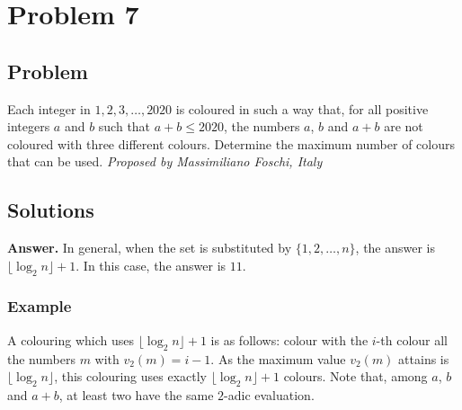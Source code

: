 \section{Problem 7}

\subsection{Problem}
Each integer in ${1, 2, 3, \ldots, 2020}$ is coloured in such a way that, for all positive integers $a$ and $b$ such that $a+b \leq 2020$, the numbers $a$, $b$ and $a+b$ are not coloured with three different colours. Determine the maximum number of colours that can be used. \nl
\textit{Proposed by Massimiliano Foschi, Italy}

\subsection{Solutions}
\textbf{Answer.} In general, when the set is substituted by $\{1, 2, \ldots, n\}$, the answer is $\lfloor \log_2 n \rfloor +1$. In this case, the answer is $11$.
\subsubsection{Example}
A colouring which uses $\lfloor \log_2 n \rfloor+1$ is as follows: colour with the $i$-th colour all the numbers $m$ with $v_2(m)=i-1$. As the maximum value $v_2(m)$ attains is $\lfloor \log_2 n \rfloor$, this colouring uses exactly $\lfloor \log_2 n \rfloor+1$ colours. Note that, among $a$, $b$ and $a+b$, at least two have the same $2$-adic evaluation.
